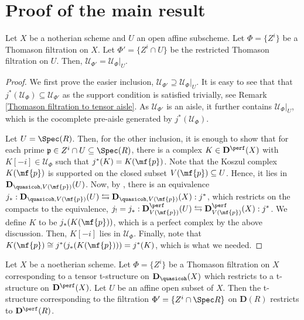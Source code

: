 \section{Proof of the main result}
\begin{Lemma}\label{Thomason filtrations restrict nicely}
    Let $X$ be a notherian scheme and $U$ an open affine subscheme. Let $\Phi=\{Z^i\}$ be a Thomason filtration on $X$. Let $\Phi'=\{Z^i \cap U\}$ be the restricted Thomason filtration on $U$. Then, $\mathcal{U}_{\Phi'}=\mathcal{U}_\Phi|_U$. 
\end{Lemma}
\begin{proof}
    We first prove the easier inclusion, $\mathcal{U}_{\Phi'}\supseteq\mathcal{U}_\Phi|_U$. It is easy to see that that $j^*(\mathcal{U}_\Phi) \subseteq \mathcal{U}_{\Phi'}$ as the support condition is satisfied trivially, see Remark \ref{Thomason filtration to tensor aisle}. As $\mathcal{U}_{\Phi'}$ is an aisle, it further contains $\mathcal{U}_\Phi|_U$, which is the cocomplete pre-aisle generated by $j^*(\mathcal{U}_\Phi)$. 

    Let $U = \Spec(R)$. Then, for the other inclusion, it is enough to show that for each prime $\mathfrak{p} \in Z^i \cap U \subseteq \Spec(R)$, there is a complex $K\in \mathbf{D}^{\perf}(X)$ with $K[-i]\in \mathcal{U}_\Phi$ such that $j^*(K)=K(\mf{p})$. Note that the Koszul complex $K(\mf{p})$ is supported on the closed subset $V(\mf{p}) \subseteq U$. Hence, it lies in $\mathbf{D}_{\quasicoh, V(\mf{p})}(U)$. Now, by \cite[Corollary 3.5 and Remark 3.6]{neeman2020bounded}, there is an equivalence $j_* : \mathbf{D}_{\quasicoh, V(\mf{p})}(U) \leftrightarrows \mathbf{D}_{\quasicoh, V(\mf{p})}(X) : j^*$, which restricts on the compacts to the equivalence, $j_! = j_* : \mathbf{D}^{\perf}_{ V(\mf{p})}(U) \leftrightarrows \mathbf{D}^{\perf}_{V(\mf{p})}(X) : j^*$. We define $K$ to be $j_*(K(\mf{p}))$, which is a perfect complex by the above discussion. Then, $K[-i]$ lies in $\mathcal{U}_\Phi$. Finally, note that $K(\mf{p}) \cong j^*(j_*(K(\mf{p}))) = j^*(K)$, which is what we needed. 
\end{proof}


\begin{Lemma}\label{restricting to affines}
       Let $X$ be a noetherian scheme. Let $\Phi=\{Z^i\}$ be a Thomason filtration on $X$ corresponding to a tensor t-structure on $\mathbf{D}_{\quasicoh}(X)$ which restricts to a t-structure on $\mathbf{D}^{\perf}(X)$. Let $U$ be an affine open subset of $X$. Then the t-structure corresponding to the filtration $\Phi'=\{Z^i \cap \Spec R\}$ on $\mathbf{D}(R)$ restricts to $\mathbf{D}^{\perf}(R)$.
\end{Lemma}

